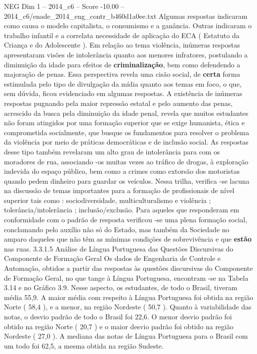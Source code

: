 \begin{textsample}{NEG Dim 1 – 2014\_c6 – Score -10.00 – 2014\_c6/enade\_2014\_eng\_contr\_b460d1a0ee.txt}
Algumas respostas indicaram como causa o modelo capitalista, o consumismo e a ganância.
Outras indicaram o trabalho infantil e a correlata necessidade de aplicação do ECA ( Estatuto da Criança e do Adolescente ).
Em relação ao tema violência, inúmeras respostas apresentaram visões de intolerância quanto aos menores infratores, postulando a diminuição da idade para efeitos de \textbf{criminalização}, bem como defendendo a majoração de penas.
Essa perspectiva revela uma cisão social, de \textbf{certa} forma estimulada pelo tipo de divulgação da mídia quanto aos temas em foco, o que, sem dúvida, ficou evidenciado em algumas respostas.
A existência de inúmeras respostas pugnando pela maior repressão estatal e pelo aumento das penas, acrescido da busca pela diminuição da idade penal, revela que muitos estudantes não foram atingidos por uma formação superior que se exige humanista, ética e comprometida socialmente, que busque os fundamentos para resolver o problema da violência por meio de práticas democráticas e de inclusão social.
As respostas desse tipo também revelaram um alto grau de intolerância para com os moradores de rua, associando -os muitas vezes ao tráfico de drogas, à exploração indevida do espaço público, bem como a crimes como extorsão dos motoristas quando pedem dinheiro para guardar os veículos.
Nessa trilha, verifica -se lacuna na discussão de temas importantes para a formação de profissionais de nível superior tais como : sociodiversidade, multiculturalismo e violência ; tolerância/intolerância ; inclusão/exclusão.
Para aqueles que responderam em conformidade com o padrão de resposta verificou -se uma plena formação social, conclamando pelo auxílio não só do Estado, mas também da Sociedade no amparo daqueles que não têm as mínimas condições de sobrevivência e que \textbf{estão} nas ruas. 3.3.1.5 Análise de Língua Portuguesa das Questões Discursivas do Componente de Formação Geral Os dados de Engenharia de Controle e Automação, obtidos a partir das respostas às questões discursivas do Componente de Formação Geral, no que tange à Língua Portuguesa, encontram -se na Tabela 3.14 e no Gráfico 3.9.
Nesse aspecto, os estudantes, de todo o Brasil, tiveram média 55,9.
A maior média com respeito à Língua Portuguesa foi obtida na região Norte ( 58,4 ), e a menor, na região Nordeste ( 50,7 ).
Quanto à variabilidade das notas, o desvio padrão de todo o Brasil foi 22,6.
O menor desvio padrão foi obtido na região Norte ( 20,7 ) e o maior desvio padrão foi obtido na região Nordeste ( 27,0 ).
A mediana das notas de Língua Portuguesa para o Brasil com um todo foi 62,5, a mesma obtida na região Sudeste.

\end{textsample}
